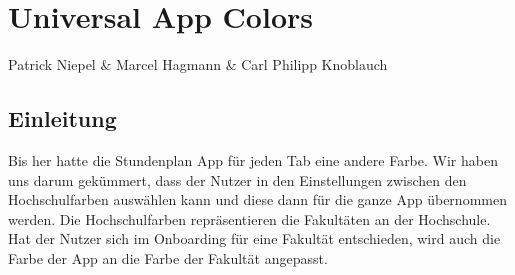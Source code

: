 \chapter{Universal App Colors}
Patrick Niepel \& Marcel Hagmann \& Carl Philipp Knoblauch

\section{Einleitung}
Bis her hatte die Stundenplan App für jeden Tab eine andere Farbe. Wir haben uns darum gekümmert, dass der Nutzer in den Einstellungen zwischen den Hochschulfarben auswählen kann und diese dann für die ganze App übernommen werden. Die Hochschulfarben repräsentieren die Fakultäten an der Hochschule. Hat der Nutzer sich im Onboarding für eine Fakultät entschieden, wird auch die Farbe der App an die Farbe der Fakultät angepasst.

